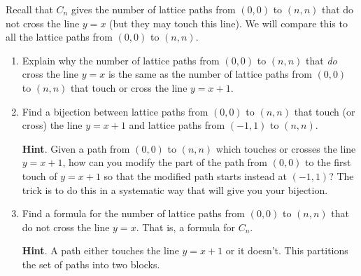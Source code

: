 \documentclass{book}
\begin{document}
\setcounter{cpjt}{182}
\addtocounter{cpjt}{-1}
\begin{activity}\label{activity-175}
\hypertarget{p-1026}{}%
Recall that \(C_n\) gives the number of lattice paths from \((0,0)\) to \((n,n)\) that do not cross the line \(y = x\) (but they may touch this line).  We will compare this to all the lattice paths from \((0,0)\) to \((n,n)\).%
\begin{enumerate}[font=\bfseries,label=(\alph*),ref=\alph*]
\item\label{task-192} \hypertarget{p-1027}{}%
Explain why the number of lattice paths from \((0,0)\) to \((n,n)\) that \emph{do} cross the line \(y = x\) is the same as the number of lattice paths from \((0,0)\) to \((n,n)\) that touch or cross the line \(y = x + 1\).%
\par\smallskip%
\noindent\item\label{task-193} \hypertarget{p-1029}{}%
Find a bijection between lattice paths from \((0,0)\) to \((n,n)\) that touch (or cross) the line \(y=x+1\) and lattice paths from \((-1,1)\) to \((n,n)\).%
\par\smallskip%
\noindent\textbf{Hint}.\hypertarget{hint-122}{}\quad%
\hypertarget{p-1030}{}%
Given a path from \((0, 0)\) to \((n, n)\) which touches or crosses the line \(y = x + 1\), how can you modify the part of the path from \((0, 0)\) to the first touch of \(y = x + 1\) so that the modified path starts instead at \((-1, 1)\)? The trick is to do this in a systematic way that will give you your bijection.%
\par\smallskip%
\noindent\item\label{task-194} \hypertarget{p-1032}{}%
Find a formula for the number of lattice paths from \((0,0)\) to \((n,n)\) that do not cross the line \(y=x\). That is, a formula for \(C_n\).%
\par\smallskip%
\noindent\textbf{Hint}.\hypertarget{hint-123}{}\quad%
\hypertarget{p-1033}{}%
A path either touches the line \(y = x + 1\) or it doesn't. This partitions the set of paths into two blocks.%
\par\smallskip%
\noindent\end{enumerate}
\end{activity}

\clearpage
\end{document}
